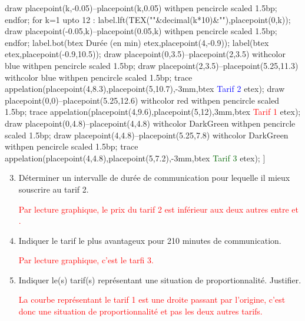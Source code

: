 \begin{corrige}
\begin{enumerate}
{                        draw placepoint(k,-0.05)--placepoint(k,0.05) withpen pencircle scaled 1.5bp;
                endfor;
                for k=1 upto 12 :
                        label.lft(TEX("\num{"&decimal(k*10)&"}"),placepoint(0,k));
                        draw placepoint(-0.05,k)--placepoint(0.05,k) withpen pencircle scaled 1.5bp;
                endfor;
                label.bot(btex Durée (en min) etex,placepoint(4,-0.9));
                label(btex  etex,placepoint(-0.9,10.5));
                draw placepoint(0,3.5)--placepoint(2,3.5) withcolor blue withpen pencircle scaled 1.5bp;
                draw placepoint(2,3.5)--placepoint(5.25,11.3) withcolor blue withpen pencircle scaled 1.5bp;
                trace appelation(placepoint(4,8.3),placepoint(5,10.7),-3mm,btex \textcolor{blue}{Tarif 2} etex);
                draw placepoint(0,0)--placepoint(5.25,12.6) withcolor red withpen pencircle scaled 1.5bp;
                trace appelation(placepoint(4,9.6),placepoint(5,12),3mm,btex \textcolor{red}{Tarif 1} etex);
                draw placepoint(0,4.8)--placepoint(4,4.8) withcolor DarkGreen withpen pencircle scaled 1.5bp;
                draw placepoint(4,4.8)--placepoint(5.25,7.8) withcolor DarkGreen withpen pencircle scaled 1.5bp;
                trace appelation(placepoint(4,4.8),placepoint(5,7.2),-3mm,btex \textcolor{DarkGreen}{Tarif 3} etex);
            }
        ]{}\par\smallskip
    \end{enumerate}
    \Coupe    
    \begin{enumerate}
        \setcounter{enumi}{2}
        \item Déterminer un intervalle de durée de communication pour lequelle il mieux souscrire au tarif 2.
        \par\textcolor{red}{Par lecture graphique, le prix du tarif 2 est inférieur aux deux autres entre  et .}        
        \item Indiquer le tarif le plus avantageux pour 210 minutes de communication.
        \par\textcolor{red}{Par lecture graphique, c'est le tarfi 3.}
        \item Indiquer le(s) tarif(s) représentant une situation de proportionnalité. Justifier.
        \par\textcolor{red}{La courbe représentant le tarif 1 est une droite passant par l'origine, c'est donc une situation de proportionnalité et pas les deux autres tarifs.}
    \end{enumerate}
\end{corrige}

